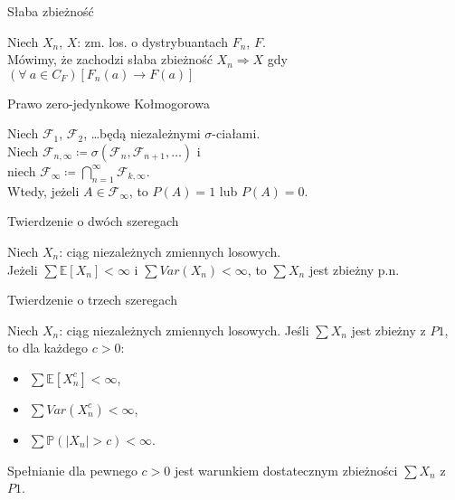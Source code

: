 \documentclass[avery5371,grid,frame]{flashcards}
\begin{document}
\begin{flashcard}[Definicja]{Słaba zbieżność}

\smallskip
Niech $X_n$, $X$: zm. los. o dystrybuantach $F_n$, $F$. \\
Mówimy, że zachodzi słaba zbieżność $X_n \Rightarrow X$ gdy $\left( \forall \ a \in C_F \right) \left[ F_n(a) \rightarrow F(a) \right]$
\end{flashcard}

\begin{flashcard}[Twierdzenie]{Prawo zero-jedynkowe Kołmogorowa}

\smallskip
Niech $\mathcal{F}_1$, $\mathcal{F}_2$, \dots będą niezależnymi $\sigma$-ciałami. \\
Niech $\mathcal{F}_{n, \infty} \coloneqq \sigma(\mathcal{F}_n, \mathcal{F}_{n+1}, \dots)$ i \\ niech $\mathcal{F}_\infty \coloneqq \bigcap \limits_{n=1}^\infty \mathcal{F}_{k, \infty}$. \\
Wtedy, jeżeli $A \in \mathcal{F}_\infty$, to $P(A) = 1$ lub $P(A) = 0$.
\end{flashcard}

\begin{flashcard}[Twierdzenie]{Twierdzenie o dwóch szeregach}

\smallskip
Niech $X_n$: ciąg niezależnych zmiennych losowych. \\
Jeżeli $\sum \mathbb{E}[X_n] < \infty$ i $\sum Var(X_n) < \infty$, to $\sum X_n$ jest zbieżny p.n.
\end{flashcard}

\begin{flashcard}[Twierdzenie]{Twierdzenie o trzech szeregach}

\smallskip
Niech $X_n$: ciąg niezależnych zmiennych losowych. Jeśli $\sum X_n$ jest zbieżny z $P1$, to dla każdego $c > 0$:
\begin{itemize}
	\item $\sum \mathbb{E}[X_n^c] < \infty$,
	\item $\sum Var(X_n^c) < \infty$,
	\item $\sum \mathbb{P}(|X_n| > c) < \infty$.
\end{itemize}
Spełnianie dla pewnego $c > 0$ jest warunkiem dostatecznym zbieżności $\sum X_n$ z $P1$.
\end{flashcard}
\end{document}
